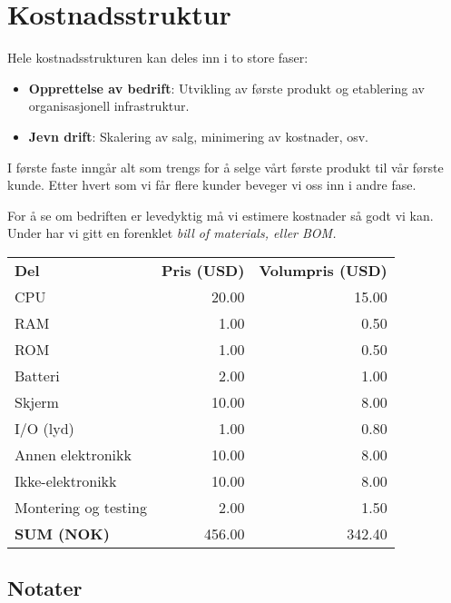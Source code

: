 \section{Kostnadsstruktur}

Hele kostnadsstrukturen kan deles inn i to store faser:

\begin{itemize}
  \item \textbf{Opprettelse av bedrift}: Utvikling av første produkt og etablering av
  organisasjonell infrastruktur.
  \item \textbf{Jevn drift}: Skalering av salg, minimering av kostnader, osv.
\end{itemize}

I første faste inngår alt som trengs for å selge vårt første produkt til vår
første kunde. Etter hvert som vi får flere kunder beveger vi oss inn i andre
fase.

For å se om bedriften er levedyktig må vi estimere kostnader så godt vi kan.
Under har vi gitt en forenklet \em{bill of materials}, eller \em{BOM}.

\begin{table}[h]
\begin{tabular}{lrr}
\textbf{Del}         & \textbf{Pris (USD)} & \textbf{Volumpris (USD)} \\
CPU                  & 20.00         &   15.00 \\
RAM                  &  1.00         &    0.50 \\
ROM                  &  1.00         &    0.50 \\
Batteri              &  2.00         &    1.00 \\
Skjerm               & 10.00         &    8.00 \\
I/O (lyd)            &  1.00         &    0.80 \\
Annen elektronikk    & 10.00         &    8.00 \\
Ikke-elektronikk     & 10.00         &    8.00 \\
Montering og testing &  2.00         &    1.50 \\
\textbf{SUM (NOK)}   & 456.00        &  342.40 \\
\end{tabular}
\end{table}


\subsection{Notater}

